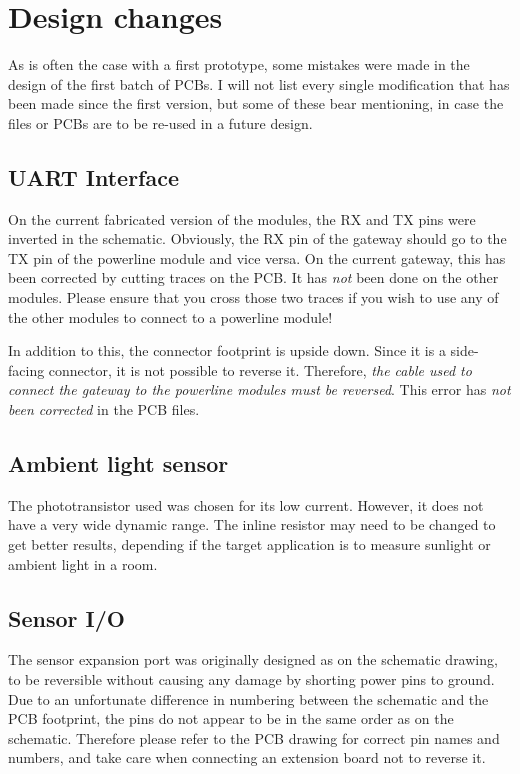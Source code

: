 \section{Design changes}
\label{sec:design-changes}

As is often the case with a first prototype, some mistakes were made in the
design of the first batch of PCBs. I will not list every single modification
that has been made since the first version, but some of these bear mentioning,
in case the files or PCBs are to be re-used in a future design.

\subsection{UART Interface}
On the current fabricated version of the modules, the RX and TX pins were
inverted in the schematic. Obviously, the RX pin of the gateway should go to the
TX pin of the powerline module and vice versa. On the current gateway, this has
been corrected by cutting traces on the PCB. It has \emph{not} been done on the
other modules. Please ensure that you cross those two traces if you wish to use
any of the other modules to connect to a powerline module!

In addition to this, the connector footprint is upside down. Since it is a
side-facing connector, it is not possible to reverse it. Therefore, \emph{the
cable used to connect the gateway to the powerline modules must be reversed}.
This error has \emph{not been corrected} in the PCB files.

\subsection{Ambient light sensor}
The phototransistor used was chosen for its low current. However, it does not
have a very wide dynamic range. The inline resistor may need to be changed to
get better results, depending if the target application is to measure sunlight
or ambient light in a room.

\subsection{Sensor I/O}
The sensor expansion port was originally designed as on the schematic drawing,
to be reversible without causing any damage by shorting power pins to ground.
Due to an unfortunate difference in numbering between the schematic and the PCB
footprint, the pins do not appear to be in the same order as on the schematic.
Therefore please refer to the PCB drawing for correct pin names and numbers, and
take care when connecting an extension board not to reverse it.

